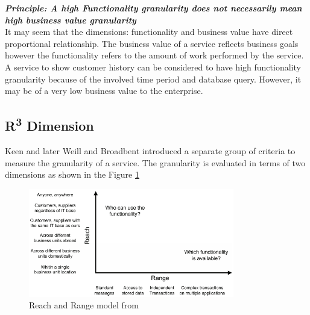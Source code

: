 \begin{framed}
\textbf{\textit{Principle: A high Functionality granularity does not necessarily mean high business value granularity}}
\\
It may seem that the dimensions: functionality and business value have direct proportional relationship. The business value of a service reflects business goals however the functionality refers to the amount of work performed by the service. A service to show customer history can be considered to have high functionality granularity because of the involved time period and database query. However, it may be of a very low business value to the enterprise. \cite{Raf-Haesen:2015aa}
\end{framed}


\subsection{R\textsuperscript{3} Dimension}\label{subsection:granularity/dimensions/r3}
Keen \cite{Keen:2015aa} and later  Weill and Broadbent \cite{Weill:1998aa} introduced a separate group of criteria to measure the granularity of a service. The granularity is evaluated in terms of two dimensions as shown in the Figure \ref{fig:Reach-Range Model}

\begin{figure}[H]
\begin{center}
\includegraphics[width=0.8\textwidth]{figures/Granularity-R3-one}
\caption{Reach and Range model from \cite{Keen:2015aa, Weill:1998aa}}
\label{fig:Reach-Range Model}
\end{center}
\end{figure}

